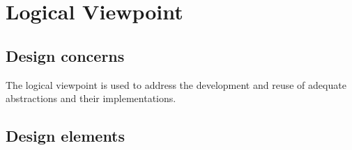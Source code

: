 \chapter{Logical Viewpoint} \label{chp:logical-viewpoint-template}

	
	\section{Design concerns} \label{s:logical-viewpoint-template:design-concerns}

		The logical viewpoint is used to address the development and reuse of adequate abstractions and their implementations.
	\section{Design elements} \label{s:logical-viewpoint-template:design-elements}

		
